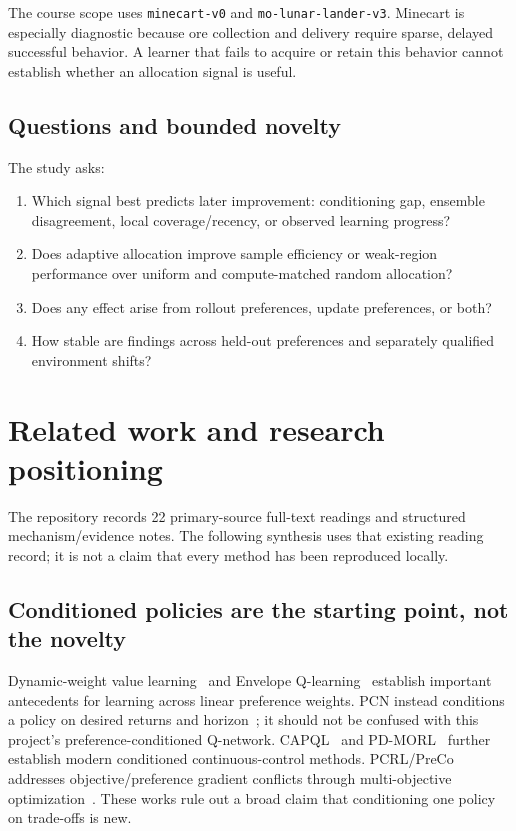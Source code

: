 The course scope uses \texttt{minecart-v0} and
\texttt{mo-lunar-lander-v3}. Minecart is especially diagnostic because ore
collection and delivery require sparse, delayed successful behavior. A learner
that fails to acquire or retain this behavior cannot establish whether an
allocation signal is useful.

\subsection{Questions and bounded novelty}
The study asks:
\begin{enumerate}
\item Which signal best predicts later improvement: conditioning gap,
ensemble disagreement, local coverage/recency, or observed learning progress?
\item Does adaptive allocation improve sample efficiency or weak-region
performance over uniform and compute-matched random allocation?
\item Does any effect arise from rollout preferences, update preferences, or both?
\item How stable are findings across held-out preferences and separately
qualified environment shifts?
\end{enumerate}

\clearpage
\section{Related work and research positioning}

The repository records 22 primary-source full-text readings and structured
mechanism/evidence notes. The following synthesis uses that existing reading
record; it is not a claim that every method has been reproduced locally.

\subsection{Conditioned policies are the starting point, not the novelty}
Dynamic-weight value learning~\cite{abels2019dynamic-weights} and Envelope
Q-learning~\cite{yang2019envelope} establish important antecedents for learning
across linear preference weights. PCN instead conditions a policy on desired
returns and horizon~\cite{reymond2022pcn}; it should not be confused with this
project's preference-conditioned Q-network. CAPQL~\cite{lu2023capql} and
PD-MORL~\cite{basaklar2023pdmorl} further establish modern conditioned continuous-control
methods. PCRL/PreCo addresses objective/preference gradient conflicts through
multi-objective optimization~\cite{yang2025pcrl}. These works rule out a broad
claim that conditioning one policy on trade-offs is new.

